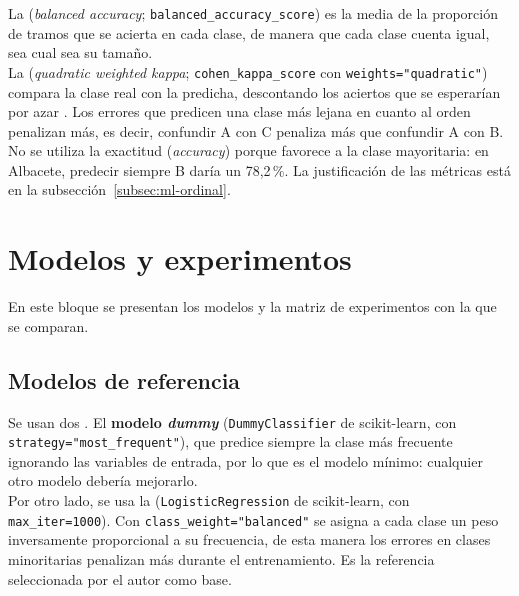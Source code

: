La \textbf{} (\textit{balanced accuracy}; \texttt{balanced\_\allowbreak accuracy\_\allowbreak score}) es la media de la proporción de tramos que se acierta en cada clase, de manera que cada clase cuenta igual, sea cual sea su tamaño.
\\

La \textbf{} (\textit{quadratic weighted kappa}; \texttt{cohen\_\allowbreak kappa\_\allowbreak score} con \texttt{weights=\allowbreak "quadratic"}) compara la clase real con la predicha, descontando los aciertos que se esperarían por azar \parencite{cohen1968}. Los errores que predicen una clase más lejana en cuanto al orden penalizan más, es decir, confundir A con C penaliza más que confundir A con B.
\\

No se utiliza la exactitud (\textit{accuracy}) porque favorece a la clase mayoritaria: en Albacete, predecir siempre B daría un 78,2\,\%. La justificación de las métricas está en la subsección~\ref{subsec:ml-ordinal}.
\\


\section{Modelos y experimentos}
\label{sec:dis-modelos-experimentos}

En este bloque se presentan los modelos y la matriz de experimentos con la que se comparan.
\\

\subsection{Modelos de referencia}
\label{subsec:dis-modelos-referencia}

Se usan dos . El \textbf{modelo \textit{dummy}} (\texttt{DummyClassifier} de scikit-learn, con \texttt{strategy=\allowbreak "most\_\allowbreak frequent"}), que predice siempre la clase más frecuente ignorando las variables de entrada, por lo que es el modelo mínimo: cualquier otro modelo debería mejorarlo.
\\

Por otro lado, se usa la \textbf{} (\texttt{LogisticRegression} de scikit-learn, con \mbox{\texttt{max\_iter=1000}}). Con \texttt{class\_\allowbreak weight=\allowbreak "balanced"} se asigna a cada clase un peso inversamente proporcional a su frecuencia, de esta manera los errores en clases minoritarias penalizan más durante el entrenamiento. Es la referencia seleccionada por el autor como base.
\\

